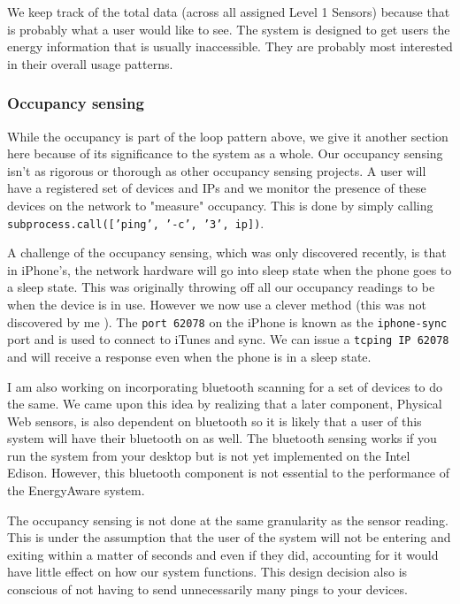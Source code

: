 \documentclass{sig-alternate-05-2015}
\begin{document}
We keep track of the total data (across all assigned Level 1 Sensors) because that is probably what a user would like to see. The system is designed to get users the energy information that is usually inaccessible. They are probably most interested in their overall usage patterns.

\subsubsection{Occupancy sensing}

While the occupancy is part of the loop pattern above, we give it another section here because of its significance to the system as a whole. Our occupancy sensing isn't as rigorous or thorough as other occupancy sensing projects. A user will have a registered set of devices and IPs and we monitor the presence of these devices on the network to "measure" occupancy. This is done by simply calling \texttt{subprocess.call(['ping', '-c', '3', ip])}.

A challenge of the occupancy sensing, which was only discovered recently, is that in iPhone's, the network hardware will go into sleep state when the phone goes to a sleep state. This was originally throwing off all our occupancy readings to be when the device is in use. However we now use a clever method (this was not discovered by me \cite{tcp}). The \texttt{port 62078} on the iPhone is known as the \texttt{iphone-sync} port and is used to connect to iTunes and sync. We can issue a \texttt{tcping IP 62078} and will receive a response even when the phone is in a sleep state.

I am also working on incorporating bluetooth scanning for a set of devices to do the same. We came upon this idea by realizing that a later component, Physical Web sensors, is also dependent on bluetooth so it is likely that a user of this system will have their bluetooth on as well. The bluetooth sensing works if you run the system from your desktop but is not yet implemented on the Intel Edison. However, this bluetooth component is not essential to the performance of the EnergyAware system.

The occupancy sensing is not done at the same granularity as the sensor reading. This is under the assumption that the user of the system will not be entering and exiting within a matter of seconds and even if they did, accounting for it would have little effect on how our system functions. This design decision also is conscious of not having to send unnecessarily many pings to your devices.
\end{document}

